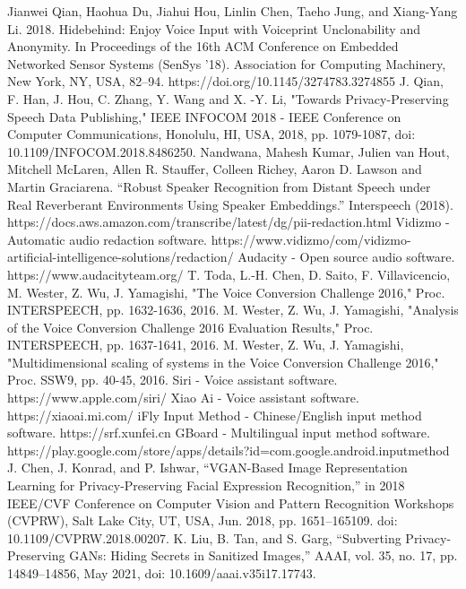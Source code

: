 \documentclass[journal]{IEEEtran} %
\begin{document}
\begin{thebibliography}{00}
     Jianwei Qian, Haohua Du, Jiahui Hou, Linlin Chen, Taeho Jung, and Xiang-Yang Li. 2018. Hidebehind: Enjoy Voice Input with Voiceprint Unclonability and Anonymity. In Proceedings of the 16th ACM Conference on Embedded Networked Sensor Systems (SenSys '18). Association for Computing Machinery, New York, NY, USA, 82–94. https://doi.org/10.1145/3274783.3274855
     J. Qian, F. Han, J. Hou, C. Zhang, Y. Wang and X. -Y. Li, "Towards Privacy-Preserving Speech Data Publishing," IEEE INFOCOM 2018 - IEEE Conference on Computer Communications, Honolulu, HI, USA, 2018, pp. 1079-1087, doi: 10.1109/INFOCOM.2018.8486250.
     Nandwana, Mahesh Kumar, Julien van Hout, Mitchell McLaren, Allen R. Stauffer, Colleen Richey, Aaron D. Lawson and Martin Graciarena. “Robust Speaker Recognition from Distant Speech under Real Reverberant Environments Using Speaker Embeddings.” Interspeech (2018).
     https://docs.aws.amazon.com/transcribe/latest/dg/pii-redaction.html
     Vidizmo - Automatic audio redaction software. https://www.vidizmo/com/vidizmo-artificial-intelligence-solutions/redaction/
     Audacity - Open source audio software. https://www.audacityteam.org/
     T. Toda, L.-H. Chen, D. Saito, F. Villavicencio, M. Wester, Z. Wu, J. Yamagishi, "The Voice Conversion Challenge 2016," Proc. INTERSPEECH, pp. 1632-1636, 2016.
     M. Wester, Z. Wu, J. Yamagishi, "Analysis of the Voice Conversion Challenge 2016 Evaluation Results," Proc. INTERSPEECH, pp. 1637-1641, 2016.
     M. Wester, Z. Wu, J. Yamagishi, "Multidimensional scaling of systems in the Voice Conversion Challenge 2016," Proc. SSW9, pp. 40-45, 2016.
     Siri - Voice assistant software. https://www.apple.com/siri/
     Xiao Ai - Voice assistant software. https://xiaoai.mi.com/
     iFly Input Method - Chinese/English input method software. https://srf.xunfei.cn
     GBoard - Multilingual input method software. https://play.google.com/store/apps/details?id=com.google.android.inputmethod
     J. Chen, J. Konrad, and P. Ishwar, “VGAN-Based Image Representation Learning for Privacy-Preserving Facial Expression Recognition,” in 2018 IEEE/CVF Conference on Computer Vision and Pattern Recognition Workshops (CVPRW), Salt Lake City, UT, USA, Jun. 2018, pp. 1651–165109. doi: 10.1109/CVPRW.2018.00207.
     K. Liu, B. Tan, and S. Garg, “Subverting Privacy-Preserving GANs: Hiding Secrets in Sanitized Images,” AAAI, vol. 35, no. 17, pp. 14849–14856, May 2021, doi: 10.1609/aaai.v35i17.17743.
\end{thebibliography}
\end{document}
